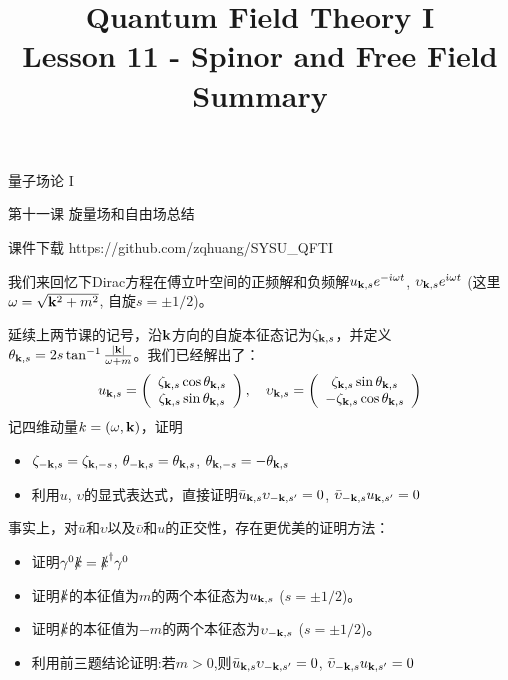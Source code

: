 \documentclass[CJK]{beamer}
\title{Quantum Field Theory I \\ Lesson 11 - Spinor and Free Field Summary}
\author{}
\date{}
\begin{document}
\begin{frame}
 
\begin{center}
\begin{Large}
\bch
量子场论 I 

{\vskip 0.3in}

第十一课 旋量场和自由场总结

\ech
\end{Large}
\end{center}

\vskip 0.2in

\bch
课件下载
\ech
https://github.com/zqhuang/SYSU\_QFTI

\end{frame}


\begin{frame}
\bch
我们来回忆下Dirac方程在傅立叶空间的正频解和负频解$u_{{\mathbf{k}},s}e^{-{\dot{\imath}} \omega t}$, $\upsilon_{{\mathbf{k}},s}e^{{\dot{\imath}} \omega t}$ (这里$\omega = \sqrt{{\mathbf{k}}^2+m^2}$, 自旋$s=\pm 1/2$)。
\skipline

延续上两节课的记号，沿${\mathbf{k}}$方向的自旋本征态记为$\zeta_{{\mathbf{k}},s}$，并定义
$\theta_{{\mathbf{k}},s} = 2s \tan^{-1}\frac{|{\mathbf{k}}|}{\omega+m}$。我们已经解出了：
\begin{equation}
u_{\veck,s} = 
\bmat{c}
\zeta_{\veck,s} \cos\theta_{\veck,s} \\
\zeta_{\veck,s} \sin\theta_{\veck,s} \\
\emat,\ \ \ 
\upsilon_{\veck,s} = 
\bmat{c}
\zeta_{\veck,s} \sin\theta_{\veck,s} \\
-\zeta_{\veck,s} \cos\theta_{\veck,s} \\
\emat \nonumber
\end{equation}
记四维动量$k = (\omega, {\mathbf{k}})$，证明
\begin{itemize}
\item{$\zeta_{-{\mathbf{k}},s} = \zeta_{{\mathbf{k}},-s}$, $\theta_{-{\mathbf{k}},s} = \theta_{{\mathbf{k}},s}$, $\theta_{{\mathbf{k}},-s} = - \theta_{{\mathbf{k}},s}$ }
\item{利用$u$, $\upsilon$的显式表达式，直接证明$\bar{u}_{{\mathbf{k}},s}\upsilon_{-{\mathbf{k}},s'} = 0$, $\bar{\upsilon}_{-{\mathbf{k}},s} u_{{\mathbf{k}},s'} = 0$}
\end{itemize}
\ech
\end{frame}

\begin{frame}
\bch
事实上，对$\bar{u}$和$\upsilon$以及$\bar{\upsilon}$和$u$的正交性，存在更优美的证明方法：
\begin{itemize}
\item{证明$\gamma^0\slashed{k} = \slashed{k}^\dagger \gamma^0$}
\item{证明$\slashed{k}$的本征值为$m$的两个本征态为$u_{{\mathbf{k}},s}$ ($s=\pm 1/2$)。}
\item{证明$\slashed{k}$的本征值为$-m$的两个本征态为$\upsilon_{-{\mathbf{k}},s}$ ($s=\pm 1/2$)。}
\item{利用前三题结论证明:若$m>0$,则$\bar{u}_{{\mathbf{k}},s}\upsilon_{-{\mathbf{k}},s'} = 0$, $\bar{\upsilon}_{-{\mathbf{k}},s} u_{{\mathbf{k}},s'} = 0$}
\end{itemize}
\ech
\end{frame}
\end{document}
